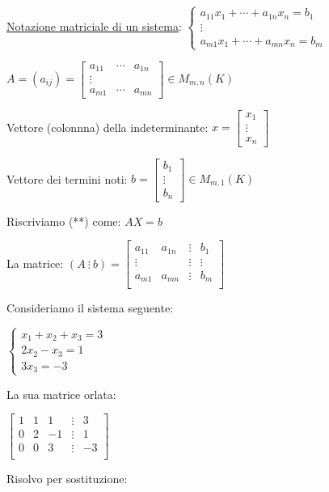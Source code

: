 \documentclass{article}
\newcommand{\ul}[1]{\underline{#1}}
\begin{document}
	\ul{Notazione matriciale di un sistema}:
$\begin{cases}
	a_{11}x_1+\cdots+a_{1n}x_n=b_1 \\
	\vdots                         \\
	a_{m1}x_1+\cdots+a_{mn}x_n=b_m
\end{cases}$

$A=(a_{ij})=\begin{bmatrix}
	a_{11} & \cdots & a_{1n} \\
	\vdots                   \\
	a_{m1} & \cdots & a_{mn}
\end{bmatrix}\in M_{m,n}(K)$

	Vettore (colonnna) della indeterminante:
$x=\begin{bmatrix}x_1\\\vdots\\x_n\end{bmatrix}$

	Vettore dei termini noti: $b=\begin{bmatrix}b_1\\\vdots\\b_n\end{bmatrix}\in M_{m,1}(K)$

	Riscriviamo (**) come:
$AX=b$

	La matrice: $(A\ \vdots\ b)=\begin{bmatrix}
	a_{11} & a_{1n} & \vdots & b_1    \\
	\vdots &        & \vdots & \vdots \\
	a_{m1} & a_{mn} & \vdots & b_m    \\
\end{bmatrix}$

	Consideriamo il sistema seguente:

$\begin{cases}
	x_1+x_2+x_3=3 \\
	2x_2-x_3=1    \\
	3x_3=-3
\end{cases}$

	La sua matrice orlata:

$\begin{bmatrix}
	1 & 1 & 1  & \vdots & 3  \\
	0 & 2 & -1 & \vdots & 1  \\
	0 & 0 & 3  & \vdots & -3 \\
\end{bmatrix}$

	Risolvo per sostituzione:
\end{document}
